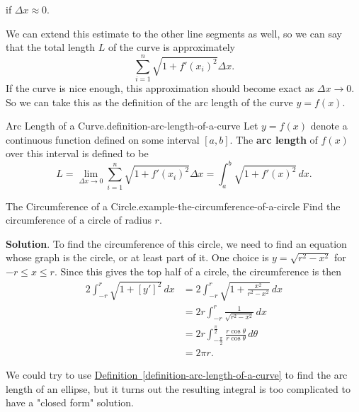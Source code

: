 \documentclass[10pt,]{book}
\newcommand{\terminology}[1]{\textbf{#1}}
\numberwithin{equation}{section}
\newcommand{\amp}{&}
\begin{document}
if \(\Delta x\approx 0\).%
\par
\hypertarget{p-653}{}%
We can extend this estimate to the other line segments as well, so we can say that the total length \(L\) of the curve is approximately%
\begin{equation*}
\sum_{i=1}^{n}\sqrt{1 + f'(x_{i})^{2}}\Delta x.
\end{equation*}
If the curve is nice enough, this approximation should become exact as \(\Delta x\to 0\). So we can take this as the definition of the arc length of the curve \(y = f(x)\).%
\begin{definition}{Arc Length of a Curve.}{definition-arc-length-of-a-curve}%
\hypertarget{p-654}{}%
Let \(y = f(x)\) denote a continuous function defined on some interval \([a,b]\). The \terminology{arc length} of \(f(x)\) over this interval is defined to be%
\begin{equation*}
L = \lim_{\Delta x\to0}\sum_{i=1}^{n}\sqrt{1 + f'(x_{i})^{2}}\Delta x = \int_{a}^{b}\sqrt{1 + f'(x)^{2}}\,dx.
\end{equation*}
%
\end{definition}
\begin{example}{The Circumference of a Circle.}{example-the-circumference-of-a-circle}%
\hypertarget{p-655}{}%
Find the circumference of a circle of radius \(r\).%
\par\smallskip%
\noindent\textbf{Solution}.\hypertarget{solution-142}{}\quad%
\hypertarget{p-656}{}%
To find the circumference of this circle, we need to find an equation whose graph is the circle, or at least part of it. One choice is \(y = \sqrt{r^{2} - x^{2}}\) for \(-r\leq x\leq r\). Since this gives the top half of a circle, the circumference is then%
\begin{align*}
2\int_{-r}^{r}\sqrt{1 + [y']^{2}}\,dx \amp = 2\int_{-r}^{r}\sqrt{1 + \frac{x^{2}}{r^{2} - x^{2}}}\,dx \\
\amp = 2r\int_{-r}^{r}\frac{1}{\sqrt{r^{2} - x^{2}}}\,dx \\
\amp = 2r\int_{-\frac{\pi}{2}}^{\frac{\pi}{2}}\frac{r\cos\theta}{r\cos\theta}\,d\theta \\
\amp = 2\pi r. 
\end{align*}
%
\end{example}
\hypertarget{p-657}{}%
We could try to use \hyperref[definition-arc-length-of-a-curve]{Definition~\ref{definition-arc-length-of-a-curve}} to find the arc length of an ellipse, but it turns out the resulting integral is too complicated to have a "closed form" solution.%
\end{document}
